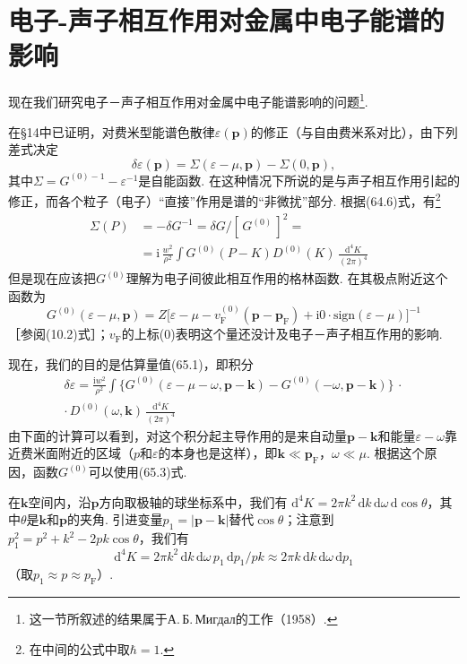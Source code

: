 \section{电子-声子相互作用对金属中电子能谱的影响}

现在我们研究电子－声子相互作用对金属中电子能谱影响的问题\footnote{这一节所叙述的结果属于А.\,Б.\,Мигдал的工作（1958）.}.

在§14中已证明，对费米型能谱色散律$\varepsilon(\bm{p})$的修正（与自由费米系对比），由下列差式决定
\begin{equation}
\delta\varepsilon(\bm{p})=\Sigma(\varepsilon-\mu,\bm{p})-\Sigma(0,\bm{p}),
\end{equation}
其中$\Sigma=G^{(0)-1}-\varepsilon^{-1}$是自能函数. 在这种情况下所说的是与声子相互作用引起的修正，而各个粒子（电子）“直接”作用是谱的“非微扰”部分. 根据(64.6)式，有\footnote{在中间的公式中取$\hbar=1$.}
\begin{equation}
\begin{aligned}
\Sigma(P)&=-\delta G^{-1}=\delta G/[\,G^{(0)}\,]^2={}&\\
&=\mathrm{i}\,\frac{w^2}{\rho^2}\int G^{(0)}(P-K)D^{(0)}(K)\,
\frac{\mathrm{d}^4K}{(2\pi)^4}
\end{aligned}
\end{equation}
但是现在应该把$G^{(0)}$理解为电子间彼此相互作用的格林函数. 在其极点附近这个函数为
\begin{equation}
G^{(0)}(\varepsilon-\mu,\bm{p})=
Z\bigl[\varepsilon-\mu-v^{(0)}_{\mathrm F}(\bm{p}-\bm{p}_{\mathrm F})
+\mathrm{i}0\cdot\mathrm{sign}(\varepsilon-\mu)\bigr]^{-1}
\end{equation}
［参阅(10.2)式］；$v_{\mathrm F}$的上标(0)表明这个量还没计及电子－声子相互作用的影响.

现在，我们的目的是估算量值(65.1)，即积分
\begin{equation}
\begin{aligned}
\delta\varepsilon=\frac{\mathrm{i}w^2}{\rho^2}\int
\bigl\{G^{(0)}(\varepsilon-\mu-\omega,\bm{p}-\bm{k})
-G^{(0)}(-\omega,\bm{p}-\bm{k})\bigr\}\,\cdot{}\\
\cdot\,D^{(0)}(\omega,\bm{k})\,\frac{\mathrm{d}^4K}{(2\pi)^4}
\end{aligned}
\end{equation}
由下面的计算可以看到，对这个积分起主导作用的是来自动量$\bm{p}-\bm{k}$和能量$\varepsilon-\omega$靠近费米面附近的区域（$p$和$\varepsilon$的本身也是这样），即$\bm{k}\ll\bm{p}_{\mathrm F}$，$\omega\ll\mu$. 根据这个原因，函数$G^{(0)}$可以使用(65.3)式.

在$\bm{k}$空间内，沿$\bm{p}$方向取极轴的球坐标系中，我们有
$\mathrm{d}^4K=2\pi k^2\,\mathrm{d}k\,\mathrm{d}\omega\,\mathrm{d}\cos\theta$，其中$\theta$是$\bm{k}$和$\bm{p}$的夹角. 引进变量$p_1=|\bm{p}-\bm{k}|$替代$\cos\theta$；注意到$p_1^2=p^2+k^2-2pk\cos\theta$，我们有
\begin{equation*}
\mathrm{d}^4K=2\pi k^2\,\mathrm{d}k\,\mathrm{d}\omega\,
p_1\,\mathrm{d}p_1/pk\approx2\pi k\,\mathrm{d}k\,\mathrm{d}\omega\,\mathrm{d}p_1
\end{equation*}
（取$p_1\approx p\approx p_{\mathrm F}$）.

